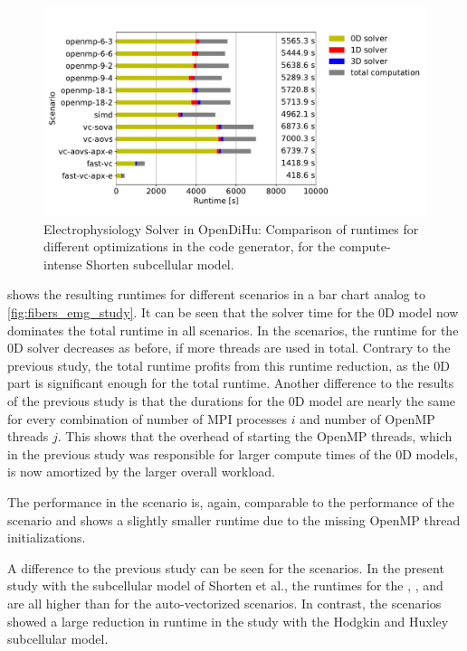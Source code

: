 \begin{figure}
  \centering%
  \includegraphics[width=\textwidth]{images/results/studies/fibers_emg_study_shorten.pdf}%
  \caption{Electrophysiology Solver in OpenDiHu: Comparison of runtimes for different optimizations in the code generator, for the compute-intense Shorten subcellular model.}%
  \label{fig:fibers_emg_study_shorten}%
\end{figure}%

 shows the resulting runtimes for different scenarios in a bar chart analog to \cref{fig:fibers_emg_study}. It can be seen that the solver time for the 0D model now dominates the total runtime in all scenarios. In the  scenarios, the runtime for the 0D solver decreases as before, if more threads are used in total. Contrary to the previous study, the total runtime profits from this runtime reduction, as the 0D part is significant enough for the total runtime. Another difference to the results of the previous study is that the durations for the 0D model are nearly the same for every combination of number of MPI processes $i$ and number of OpenMP threads $j$. This shows that the overhead of starting the OpenMP threads, which in the previous study was responsible for larger compute times of the 0D models, is now amortized by the larger overall workload.

The performance in the  scenario is, again, comparable to the performance of  the  scenario and shows a slightly smaller runtime due to the missing OpenMP thread initializations.

A difference to the previous study can be seen for the  scenarios. In the present study with the subcellular model of Shorten et al., the runtimes for the , , and  are all higher than for the auto-vectorized scenarios. In contrast, the  scenarios showed a large reduction in runtime in the study with the Hodgkin and Huxley subcellular model. 

